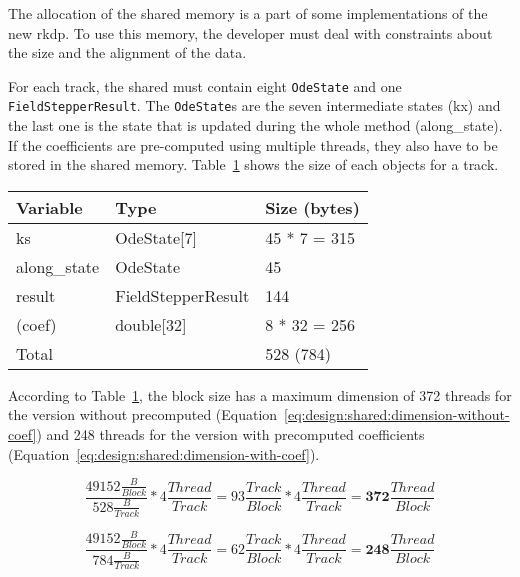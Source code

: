 The allocation of the shared memory is a part of some implementations of the
new \acrshort{rkdp}.
To use this memory, the developer must deal with constraints about the size and
the alignment of the data.

For each track, the shared must contain eight \texttt{OdeState} and one
\texttt{FieldStepperResult}. The \texttt{OdeState}s are the seven intermediate
states (kx) and the last one is the state that is updated during the
whole method (along\_state).
If the coefficients are pre-computed using multiple threads, they also have to be
stored in the shared memory.
Table~\ref{tab:design:shared-component} shows the size of each objects for a
track.

\begin{table}[ht]
    \centering
    \begin{tabular}{|l|l|l|}
        \hline
        \textbf{Variable} & \textbf{Type} & \textbf{Size (bytes)} \\
        \hline
        ks & OdeState[7] & 45 * 7 = 315 \\
        \hline
        along\_state & OdeState & 45 \\
        \hline
        result & FieldStepperResult & 144 \\
        \hline
        (coef) & double[32] & 8 * 32 = 256 \\
        \hline
        \multicolumn{2}{|l|}{Total} & 528 (784) \\
        \hline
    \end{tabular}
    \label{tab:design:shared-component}
\end{table}

According to Table~\ref{tab:design:shared-component}, the block size
has a maximum dimension of 372 threads for the version without precomputed (Equation~\ref{eq:design:shared:dimension-without-coef})
and 248 threads for the version with precomputed coefficients (Equation~\ref{eq:design:shared:dimension-with-coef}).

\begin{equation}
    \frac{49152\frac{B}{Block} }{528 \frac{B}{Track} } * 4 \frac{Thread}{Track} = 93\frac{Track}{Block} * 4 \frac{Thread}{Track} = \textbf{372}\frac{Thread}{Block}
    \label{eq:design:shared:dimension-without-coef}
\end{equation}

\begin{equation}
    \frac{49152\frac{B}{Block} }{784 \frac{B}{Track} } * 4 \frac{Thread}{Track} = 62\frac{Track}{Block} * 4 \frac{Thread}{Track} = \textbf{248}\frac{Thread}{Block}
    \label{eq:design:shared:dimension-with-coef}
\end{equation}

